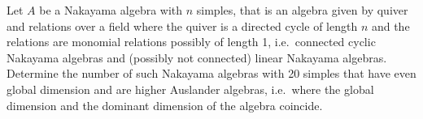 Let $A$ be a Nakayama algebra with $n$ simples, that is an algebra given by quiver and relations over a field where the quiver is a directed cycle of length $n$ and the relations are monomial relations possibly of length 1, i.e.\ connected cyclic Nakayama algebras and (possibly not connected) linear Nakayama algebras. Determine the number of such Nakayama algebras with 20 simples that have even global dimension and are higher Auslander algebras, i.e.\ where the global dimension and the dominant dimension of the algebra coincide.
